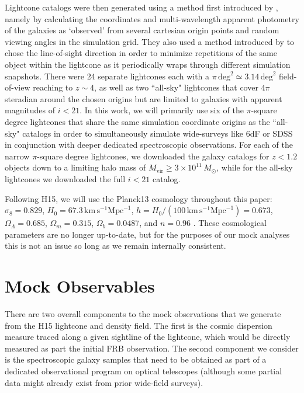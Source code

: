 \documentclass[twocolumn]{aastex63}
\begin{document}
\begin{CJK*}{UTF8}{gbsn}
Lightcone catalogs were then generated using a method first introduced by \citet{blaizot:2005}, namely by calculating the coordinates and multi-wavelength apparent photometry of the galaxies as `observed' from several cartesian origin points
and random viewing angles in the simulation grid. They also used a method introduced by \citet{kitzbichler:2007} to chose the line-of-sight direction in order to minimize repetitions
of the same object within the lightcone as it periodically wraps through different simulation snapshots.
There were 24 separate lightcones each with a $\pi\,\mathrm{deg}^2 \simeq 3.14\,\mathrm{deg}^2$ field-of-view reaching to $z \sim 4$, as well as two ``all-sky" lightcones
that cover $4\pi$ steradian around the chosen origins but are limited to galaxies with apparent magnitudes of $i<21$. In this work, we will primarily use six of the $\pi$-square degree
lightcones that share the same simulation coordinate origins as the ``all-sky" catalogs in order to simultaneously simulate wide-surveys like 6dF or SDSS in conjunction with deeper dedicated
spectroscopic observations. For each of the narrow $\pi$-square degree lightcones, we 
downloaded the galaxy catalogs for $z<1.2$ objects down to a limiting halo mass of $M_\mathrm{vir} \geq 3\times 10^{11}\,M_\odot$, while for the all-sky lightcones we downloaded
the full $i<21$ catalog.

Following H15, we will use the Planck13 cosmology throughout this paper:
$\sigma_8 = 0.829$, $H_0 = 67.3\,\mathrm{km}\, \mathrm{s}^{-1} \mathrm{Mpc}^{-1}$,
$h=H_0/(100\,\mathrm{km}\, \mathrm{s}^{-1} \mathrm{Mpc}^{-1})=0.673$, $ \Omega_\Lambda = 0.685$, $\Omega_m = 0.315$,  
$\Omega_b = 0.0487$, and $n = 0.96$ \citep{planck-collaboration:2014}. These cosmological parameters are no longer up-to-date, but for the purposes of our mock
analyses this is not an issue so long as we remain internally consistent.

\section{Mock Observables} \label{sec:obs}

There are two overall components to the mock observations that we generate from the H15 lightcone and 
density field. The first is the cosmic dispersion measure traced along a given sightline of the lightcone, which would
be directly measured as part the initial FRB observation. The second component we  consider is the spectroscopic galaxy samples 
that need to be obtained as part of a dedicated observational program on optical telescopes (although some partial data might
already exist from prior wide-field surveys). 


\end{CJK*}
\end{document}
